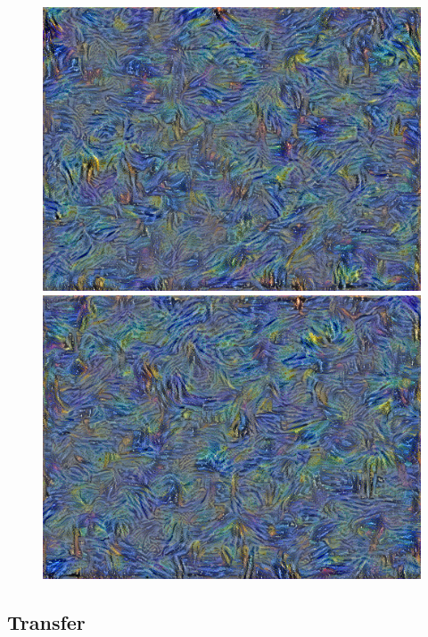 \documentclass{article}
\begin{document}
\begin{figure}[htp]
    \begin{minipage}{0.3\linewidth}
    \includegraphics[width=\textwidth]{img/style/block4_conv1}
    \end{minipage}
    \begin{minipage}{0.3\linewidth}
    \includegraphics[width=\textwidth]{img/style/block5_conv1}
    \end{minipage}

\end{figure}



\subsection{Transfer}
\end{document}
